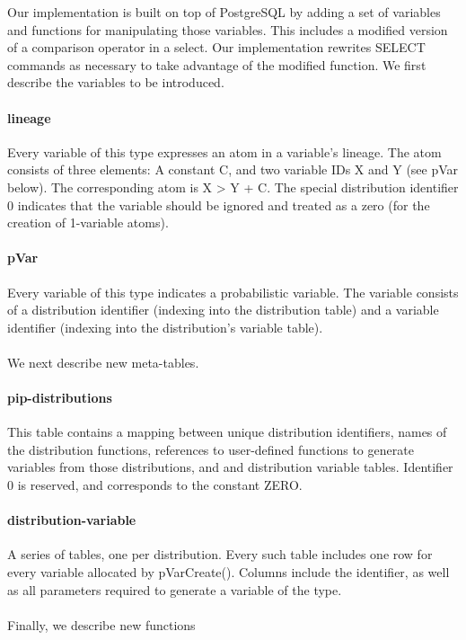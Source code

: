 Our implementation is built on top of PostgreSQL by adding a set of variables and functions for manipulating those variables.  This includes a modified version of a comparison operator in a select.  Our implementation rewrites SELECT commands as necessary to take advantage of the modified function.  We first describe the variables to be introduced.

\paragraph{lineage} Every variable of this type expresses an atom in a variable's lineage.  The atom consists of three elements: A constant C, and two variable IDs X and Y (see pVar below).  The corresponding atom is X > Y + C.  The special distribution identifier 0 indicates that the variable should be ignored and treated as a zero (for the creation of 1-variable atoms).

\paragraph{pVar} Every variable of this type indicates a probabilistic variable.  The variable consists of a distribution identifier (indexing into the distribution table) and a variable identifier (indexing into the distribution's variable table).  
\\
\\
We next describe new meta-tables.
\paragraph{pip-distributions} This table contains a mapping between unique distribution identifiers, names of the distribution functions, references to user-defined functions to generate variables from those distributions, and and distribution variable tables.  Identifier 0 is reserved, and corresponds to the constant ZERO.

\paragraph{distribution-variable} A series of tables, one per distribution.  Every such table includes one row for every variable allocated by pVarCreate().  Columns include the identifier, as well as all parameters required to generate a variable of the type.
\\
\\
Finally, we describe new functions

